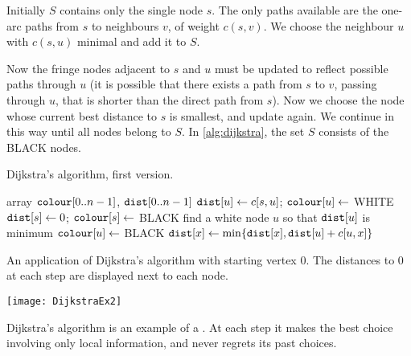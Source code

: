 Initially $S$ contains only the single node $s$. 
The only paths available are the one-arc paths from $s$ to neighbours $v$, of weight $c(s, v)$. 
We choose the neighbour $u$ with $c(s, u)$ minimal and add it to $S$. 

Now the fringe nodes adjacent to $s$ and $u$ must be updated to reflect possible paths through $u$ 
(it is possible that there exists a path from $s$ to $v$, passing through $u$, that is shorter than the direct path from $s$). 
Now we choose the node whose current best distance to $s$ is smallest, and update again. 
We continue in this way until all nodes belong to $S$. In \cref{alg:dijkstra}, the set $S$ consists of the BLACK nodes.

\begin{algorithm}[H]
  \caption{Dijkstra's algorithm, first version.}
    \label{alg:dijkstra}
\begin{algorithmic}[1]
	\State array $\operatorname{\text{\texttt{colour}}}[0..n-1]$, $\operatorname{\text{\texttt{dist}}}[0..n-1]$
		\State $\operatorname{\text{\texttt{dist}}}[u] \gets c[s,u]$; $\operatorname{\text{\texttt{colour}}}[u] \gets$ WHITE 
	\EndFor
	\State $\operatorname{\text{\texttt{dist}}}[s] \gets 0$; $\operatorname{\text{\texttt{colour}}}[s] \gets $ BLACK
		\State find a white node $u$ so that $\operatorname{\text{\texttt{dist}}}[u]$ is minimum
		\State $\operatorname{\text{\texttt{colour}}}[u] \gets $ BLACK
				\State $\operatorname{\text{\texttt{dist}}}[x] \gets \min \{\operatorname{\text{\texttt{dist}}}[x], \operatorname{\text{\texttt{dist}}}[u] + c[u,x]\}$  
			\EndIf
		\EndFor
	\EndWhile
	\State \Return{$\dist$}
\EndFunction
\end{algorithmic}
\end{algorithm}

\begin{Boxample}
An application of Dijkstra's algorithm with starting vertex $0$. 
The distances to 0 at each step are displayed next to each node.
\begin{center}
\texttt{[image: DijkstraEx2]}
\end{center}
\end{Boxample}

Dijkstra's algorithm is an example of a . 
At each step it makes the best choice involving only local information,
and never regrets its past choices. 

